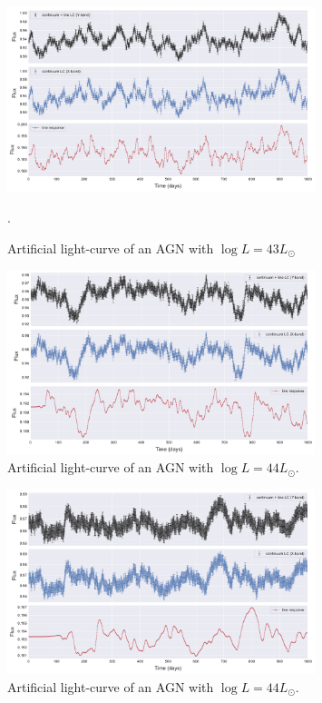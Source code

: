 \documentclass[letterpaper, oneside]{article}
\begin{document}
\begin{figure}[h]
	\centering
	\includegraphics[width=0.8\textwidth]{../art_lcs_logL43.pdf}
	\caption{Artificial light-curve of an AGN with $\log L = 43 L_{\odot}$}.
	\label{fig:art_lcs_L43}
\end{figure}

\begin{figure}[h]
	\centering
	\includegraphics[width=0.8\textwidth]{../art_lcs_logL44.pdf}
	\caption{Artificial light-curve of an AGN with $\log L = 44 L_{\odot}$.}
	\label{fig:art_lcs_L44}
\end{figure}

\begin{figure}[h]
	\centering
	\includegraphics[width=0.8\textwidth]{../art_lcs_logL45.pdf}
	\caption{Artificial light-curve of an AGN with $\log L = 44 L_{\odot}$.}
	\label{fig:art_lcs_L45}
\end{figure}
\end{document}
